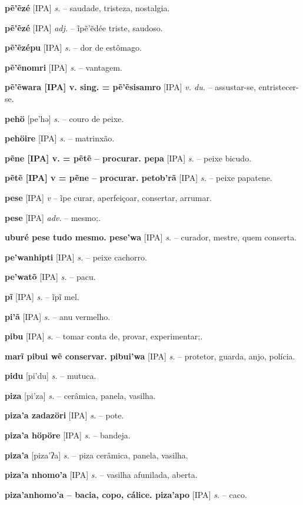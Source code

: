\textbf{pẽ'ẽzé} [IPA] \textit{s.} -- saudade, tristeza, nostalgia.

\textbf{pẽ'ẽzé} [IPA] \textit{adj.} -- ĩpẽ'ẽdée triste, saudoso.

\textbf{pẽ'ẽzépu} [IPA] \textit{s.} -- dor de estômago.

\textbf{pẽ'ẽnomri} [IPA] \textit{s.} -- vantagem.

\textbf{pẽ'ẽwara [IPA] v. sing. = pẽ'ẽsisamro} [IPA] \textit{v. du.} -- assustar-se, entristecer-se.

\textbf{pehö} [pe'hə] \textit{s.} -- couro de peixe.

\textbf{pehöire} [IPA] \textit{s.} -- matrinxão.

\textbf{pẽne [IPA] v. = pẽtẽ -- procurar. pepa} [IPA] \textit{s.} -- peixe bicudo.

\textbf{pẽtẽ [IPA] v = pẽne -- procurar. petob'rã} [IPA] \textit{s.} -- peixe papatene.

\textbf{pese} [IPA] \textit{v} -- ĩpe curar, aperfeiçoar, consertar, arrumar.

\textbf{pese} [IPA] \textit{adv.} -- mesmo;.

\textbf{uburé pese tudo mesmo. pese'wa} [IPA] \textit{s.} -- curador, mestre, quem conserta.

\textbf{pe'wanhipti} [IPA] \textit{s.} -- peixe cachorro.

\textbf{pe'watõ} [IPA] \textit{s.} -- pacu.

\textbf{pĩ} [IPA] \textit{s.} -- ĩpĩ mel.

\textbf{pi'ã} [IPA] \textit{s.} -- anu vermelho.

\textbf{pibu} [IPA] \textit{s.} -- tomar conta de, provar, experimentar;.

\textbf{marĩ pibui wẽ conservar. pibui'wa} [IPA] \textit{s.} -- protetor, guarda, anjo, polícia.

\textbf{pidu} [pi'du] \textit{s.} -- mutuca.

\textbf{piza} [pi'za] \textit{s.} -- cerâmica, panela, vasilha.

\textbf{piza'a zadazöri} [IPA] \textit{s.} -- pote.

\textbf{piza'a höpöre} [IPA] \textit{s.} -- bandeja.

\textbf{piza'a} [piza'ʔa] \textit{s.} -- piza cerâmica, panela, vasilha.

\textbf{piza'a nhomo'a} [IPA] \textit{s.} -- vasilha afunilada, aberta.

\textbf{piza'anhomo'a -- bacia, copo, cálice. piza'apo} [IPA] \textit{s.} -- caco.

